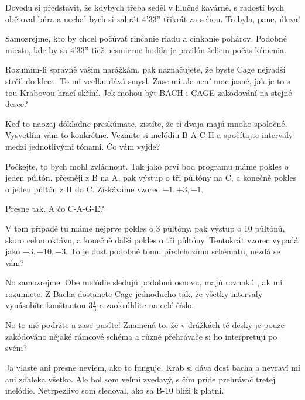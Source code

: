 \documentclass[12pt]{article}
\begin{document}
\begin{description}[itemsep=0pt]
\item[A:] Dovedu si představit, že kdybych třeba seděl v hlučné kavárně, s radostí
    bych obětoval bůra a nechal bych si zahrát 4'33'' třikrát za sebou. To byla, pane, úleva!

\item[Ž:] Samozrejme, kto by chcel počúvať rinčanie riadu a cinkanie pohárov. Podobné 
    miesto, kde by sa 4'33'' tiež nesmierne hodila je pavilón šeliem počas kŕmenia.

\item[A:] Rozumím-li správně vaším narážkám, pak naznačujete, že byste Cage nejradši
    strčil do klece. To mi vcelku dává smysl. Zase mi ale není moc jasné, jak je
    to s tou Krabovou hrací skříní. Jek mohou být BACH i CAGE zakódování na stejné
    desce?

\item[Ž:] Keď to naozaj dôkladne preskúmate, zistíte, že tí dvaja majú mnoho spoločné. 
    Vysvetlím vám to konkrétne. Vezmite si melódiu B-A-C-H a spočítajte intervaly medzi 
    jednotlivými tónami. Čo vám vyjde?

\item[A:] Počkejte, to bych mohl zvládnout. Tak jako prví bod programu
    máme pokles o jeden půltón, přesněji z B na A, pak výstup o tři půltóny
    na C, a konečně pokles o jeden půltón z H do C. Získáváme vzorec $-1, +3, -1$.

\item[Ž:] Presne tak. A čo C-A-G-E?

\item[A:] V tom případě tu máme nejprve pokles o 3 půltóny, pak výstup o
    10 půltónů, skoro celou oktávu, a konečně další pokles o tři půltóny.
    Tentokrát vzorec vypadá jako $-3, +10, -3$. To je dost podobné
    tomu předchozímu schématu, nezdá se vám?

\item[Ž:] No samozrejme. Obe melódie sledujú podobnú osnovu, majú rovnakú 
    , ak mi rozumiete. Z Bacha dostanete Cage jednoducho tak, 
    že všetky intervaly vynásobíte konštantou $3\frac{1}{3}$ a zaokrúhlite 
    na celé číslo.

\item[A:] No to mě podržte a zase pusťte! Znamená to, že v drážkách té desky
    je pouze zakódováno nějaké rámcové schéma a různé přehrávače si ho interpretují
    po svém?

\item[Ž:] Ja vlaste ani presne neviem, ako to funguje. Krab si dáva dosť bacha 
    a nevraví mi ani zďaleka všetko. Ale bol som veľmi zvedavý, s čím príde 
    prehrávač tretej melódie. Netrpezlivo som sledoval, ako sa B-10 blíži k platni.


\end{description}
\end{document}
